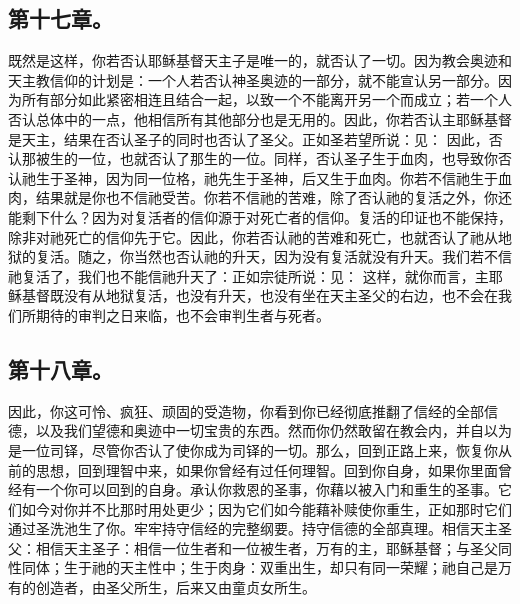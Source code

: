 
\subsection{第十七章。}

\par

既然是这样，你若否认耶稣基督天主子是唯一的，就否认了一切。因为教会奥迹和天主教信仰的计划是：一个人若否认神圣奥迹的一部分，就不能宣认另一部分。因为所有部分如此紧密相连且结合一起，以致一个不能离开另一个而成立；若一个人否认总体中的一点，他相信所有其他部分也是无用的。因此，你若否认主耶稣基督是天主，结果在否认圣子的同时也否认了圣父。正如圣若望所说：见： 因此，否认那被生的一位，也就否认了那生的一位。同样，否认圣子生于血肉，也导致你否认祂生于圣神，因为同一位格，祂先生于圣神，后又生于血肉。你若不信祂生于血肉，结果就是你也不信祂受苦。你若不信祂的苦难，除了否认祂的复活之外，你还能剩下什么？因为对复活者的信仰源于对死亡者的信仰。复活的印证也不能保持，除非对祂死亡的信仰先于它。因此，你若否认祂的苦难和死亡，也就否认了祂从地狱的复活。随之，你当然也否认祂的升天，因为没有复活就没有升天。我们若不信祂复活了，我们也不能信祂升天了：正如宗徒所说：见： 这样，就你而言，主耶稣基督既没有从地狱复活，也没有升天，也没有坐在天主圣父的右边，也不会在我们所期待的审判之日来临，也不会审判生者与死者。\par


\subsection{第十八章。}

\par

因此，你这可怜、疯狂、顽固的受造物，你看到你已经彻底推翻了信经的全部信德，以及我们望德和奥迹中一切宝贵的东西。然而你仍然敢留在教会内，并自以为是一位司铎，尽管你否认了使你成为司铎的一切。那么，回到正路上来，恢复你从前的思想，回到理智中来，如果你曾经有过任何理智。回到你自身，如果你里面曾经有一个你可以回到的自身。承认你救恩的圣事，你藉以被入门和重生的圣事。它们如今对你并不比那时用处更少；因为它们如今能藉补赎使你重生，正如那时它们通过圣洗池生了你。牢牢持守信经的完整纲要。持守信德的全部真理。相信天主圣父：相信天主圣子：相信一位生者和一位被生者，万有的主，耶稣基督；与圣父同性同体；生于祂的天主性中；生于肉身：双重出生，却只有同一荣耀；祂自己是万有的创造者，由圣父所生，后来又由童贞女所生。\par

